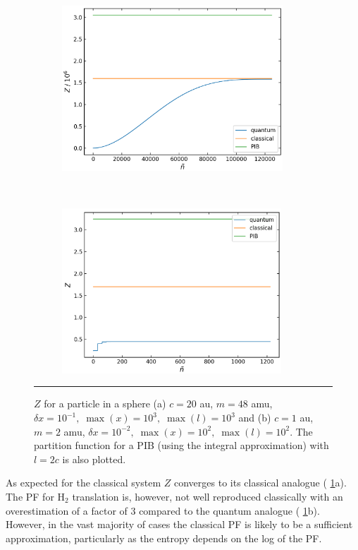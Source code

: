 \documentclass[../main.tex]{subfiles}
\begin{document}
\begin{figure}[b!]
	\begin{subfigure}[t]{0.49\textwidth}
		\centering
		\includegraphics[height=6.2cm]{4/figs/spherical_well_20_c_87456_m_point1_dx_pf}
		\caption{}
	\end{subfigure}%
	~ 
	\begin{subfigure}[t]{0.49\textwidth}
		\centering
		\includegraphics[height=6.2cm]{4/figs/spherical_well_1_c_3644_m_pf}
		\caption{}
	\end{subfigure}
	\vspace{0.2cm}
	\hrule
	\caption{$Z$ for a particle in a sphere (a) $c = 20$ au, $m = 48$ amu, $\delta x = 10^{-1},\;\max(x) = 10^3,\;\max(l) = 10^3$ and (b) $c = 1$ au, $m = 2$ amu, $\delta x = 10^{-2} ,\;\max(x) = 10^2,\;\max(l) = 10^2$. The partition function for a PIB (using the integral approximation) with $l = 2c$ is also plotted.} 
	\label{spherical_well_quantum_classical}
\end{figure}


As expected for the classical system $Z$ converges to its classical analogue (\figurename{ \ref{spherical_well_quantum_classical}}a). The PF for H$_2$ translation is, however, not well reproduced classically with an overestimation of a factor of 3 compared to the quantum analogue (\figurename{ \ref{spherical_well_quantum_classical}}b). However, in the vast majority of cases the classical PF is likely to be a sufficient approximation, particularly as the entropy depends on the log of the PF.
\end{document}
